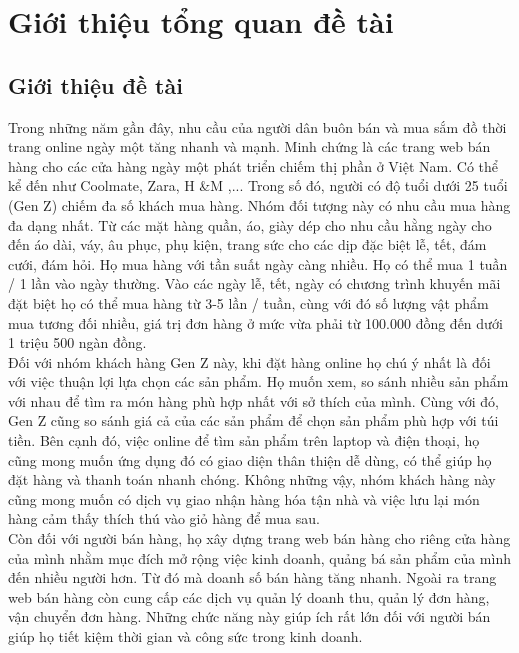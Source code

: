 \section{Giới thiệu tổng quan đề tài}
\subsection{Giới thiệu đề tài}

Trong những năm gần đây, nhu cầu của người dân buôn bán và mua sắm đồ thời trang online ngày một tăng nhanh và mạnh. Minh chứng là các trang web bán hàng cho các cửa hàng ngày một phát triển chiếm thị phần ở Việt Nam. Có thể kể đến như Coolmate, Zara, H \&M ,... Trong số đó, người có độ tuổi dưới 25 tuổi (Gen Z) chiếm đa số khách mua hàng. Nhóm đối tượng này có nhu cầu mua hàng đa dạng nhất. Từ các mặt hàng quần, áo, giày dép cho nhu cầu hằng ngày cho đến áo dài, váy, âu phục, phụ kiện, trang sức cho các dịp đặc biệt lễ, tết, đám cưới, đám hỏi. Họ mua hàng với tần suất ngày càng nhiều. Họ có thể mua 1 tuần / 1 lần vào ngày thường. Vào các ngày lễ, tết, ngày có chương trình khuyến mãi đặt biệt họ có thể mua hàng từ 3-5 lần / tuần, cùng với đó số lượng vật phẩm mua tương đối nhiều, giá trị đơn hàng ở mức vừa phải từ 100.000 đồng đến dưới 1 triệu 500 ngàn đồng.\\

Đối với nhóm khách hàng Gen Z này, khi đặt hàng online họ chú ý nhất là đối với việc thuận lợi lựa chọn các sản phẩm. Họ muốn xem, so sánh nhiều sản phẩm với nhau để tìm ra món hàng phù hợp nhất với sở thích của mình. Cùng với đó, Gen Z cũng so sánh giá cả của các sản phẩm để chọn sản phẩm phù hợp với túi tiền. Bên cạnh đó, việc online để tìm sản phẩm trên laptop và điện thoại, họ cũng mong muốn ứng dụng đó có giao diện thân thiện dễ dùng, có thể giúp họ đặt hàng và thanh toán nhanh chóng. Không những vậy, nhóm khách hàng này cũng mong muốn có dịch vụ giao nhận hàng hóa tận nhà và việc lưu lại món hàng cảm thấy thích thú vào giỏ hàng để mua sau. \\

Còn đối với người bán hàng, họ xây dựng trang web bán hàng cho riêng cửa hàng của mình nhằm mục đích mở rộng việc kinh doanh, quảng bá sản phẩm của mình đến nhiều người hơn. Từ đó mà doanh số bán hàng tăng nhanh. Ngoài ra trang web bán hàng còn cung cấp các dịch vụ quản lý doanh thu, quản lý đơn hàng, vận chuyển đơn hàng. Những chức năng này giúp ích rất lớn đối với người bán giúp họ tiết kiệm thời gian và công sức trong kinh doanh. \\

